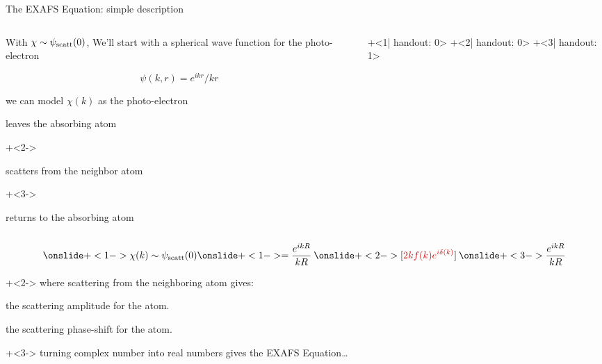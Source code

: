 \begin{slide}{The EXAFS Equation: simple description}

    \vmm
    \begin{cenpage}{125mm}

      \begin{columns}[T]

    \begin{column}{65mm}
      With ${ \chi \sim \psi_{\rm scatt}(0)}$, We'll start with a spherical
      wave function for the photo-electron

      \[ \psi(k,r) = {{e^{ikr}}/{kr}} \]

      we can model $\chi(k)$ as the photo-electron 
        \begin{enumerate}
          \item leaves the absorbing atom
          {\onslide+<2->{ \item scatters from the neighbor atom}}
          {\onslide+<3->{ \item returns to the absorbing atom}}
        \end{enumerate}
      \end{column}
      \begin{column}{60mm}
        \begin{overprint}[55mm]
          \onslide+<1| handout: 0> 
          \onslide+<2| handout: 0> 
          \onslide+<3| handout: 1> 
        \end{overprint}

      \end{column}
    \end{columns}


    \vmm

    {\large
       \[ {\displaystyle
         {\onslide+<1-> \chi(k) \sim \psi_{\rm scatt}(0)}
         {\onslide+<1-> = {{e^{ikR}}\over{kR}} \> }
         {\onslide+<2-> [{\Red{2k f(k)e^{i\delta(k)}}} ] \> }
         {\onslide+<3-> {{e^{ikR}}\over{kR}}}
      }
       \]
     }

     {    \onslide+<2->
       where scattering from the neighboring atom gives:

        \begin{description} \settowidth{\labelwidth}{5mm} \setlength{\itemindent}{-5mm}

        \item[\Red{ $f(k)$ \hspace{1mm}}] the scattering amplitude for the atom.
        \item[\Red{ $\delta(k)$ \hspace{1mm}}] the scattering phase-shift for the atom.
       \end{description}
     }

     {\onslide+<3-> \hspace{5mm} turning complex number into real numbers gives the EXAFS Equation\ldots }

     \end{cenpage}
\end{slide}
